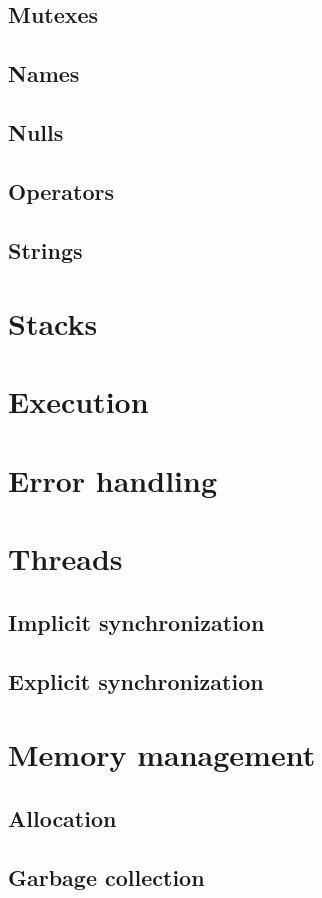 \subsection{Mutexes}
\subsection{Names}
\subsection{Nulls}
\subsection{Operators}
\subsection{Strings}

\section{Stacks}

\section{Execution}

\section{Error handling}

\section{Threads}
\subsection{Implicit synchronization}
\subsection{Explicit synchronization}

\section{Memory management}
\subsection{Allocation}
\subsection{Garbage collection}

